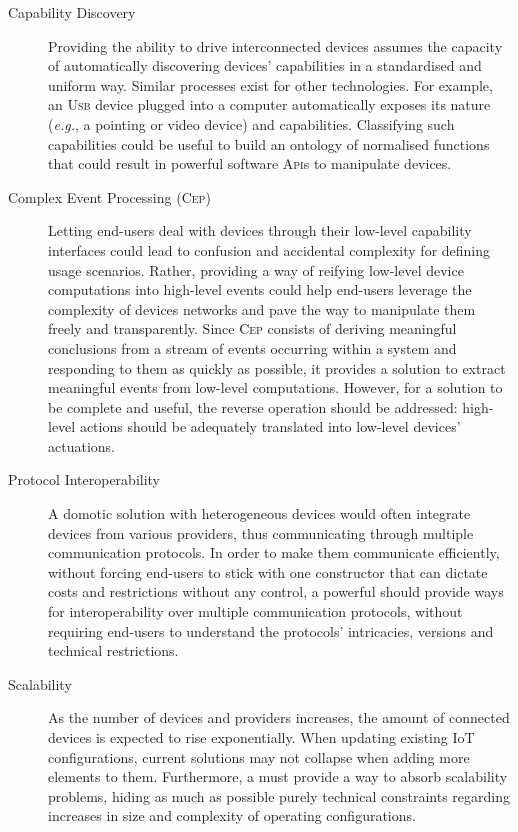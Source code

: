\begin{description}
	\item[Capability Discovery] Providing the ability to drive interconnected devices assumes the capacity of automatically discovering devices' capabilities in a standardised and uniform way. Similar processes exist for other technologies. For example, an \textsc{Usb} device plugged into a computer automatically exposes its nature (\textit{e.g.}, a pointing or video device) and capabilities. Classifying such capabilities could be useful to build an ontology of normalised functions that could result in powerful software \textsc{Api}s to manipulate devices. 
		
	\item[Complex Event Processing (\textsc{Cep})] Letting end-users deal with devices through their low-level capability interfaces could lead to confusion and accidental complexity for defining usage scenarios. Rather, providing a way of reifying low-level device computations into high-level events could help end-users leverage the complexity of devices networks and pave the way to manipulate them freely and transparently. Since \textsc{Cep} consists of deriving meaningful conclusions from a stream of events occurring within a system and responding to them as quickly as possible, it provides a solution to extract meaningful events from low-level computations. However, for a solution to be complete and useful, the reverse operation should be addressed: high-level actions should be adequately translated into low-level devices' actuations. 
		
	\item[Protocol Interoperability] A domotic solution with heterogeneous devices would often integrate devices from various providers, thus communicating through multiple communication protocols. In order to make them communicate efficiently, without forcing end-users to stick with one constructor that can dictate costs and restrictions without any control, a powerful \DSL should provide ways for interoperability over multiple communication protocols, without requiring end-users to understand the protocols' intricacies, versions and technical restrictions.
	
	\item[Scalability] As the number of devices and providers increases, the amount of connected devices is expected to rise exponentially. When updating existing IoT configurations, current solutions may not collapse when adding more elements to them. Furthermore, a \DSL must provide a way to absorb scalability problems, hiding as much as possible purely technical constraints regarding increases in size and complexity of operating configurations. 
	

\end{description}
